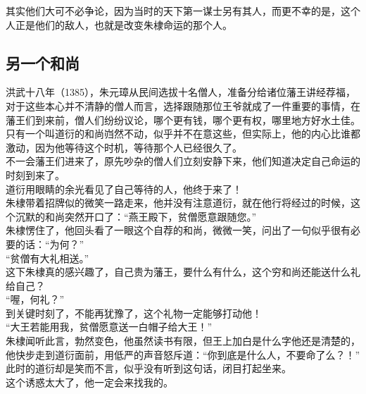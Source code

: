 \begin{multicols}{\theparacolNo}
其实他们大可不必争论，因为当时的天下第一谋士另有其人，而更不幸的是，这个人正是他们的敌人，也就是改变朱棣命运的那个人。\\

\subsection{另一个和尚}
洪武十八年（1385），朱元璋从民间选拔十名僧人，准备分给诸位藩王讲经荐福，对于这些本心并不清静的僧人而言，选择跟随那位王爷就成了一件重要的事情，在藩王们到来前，僧人们纷纷议论，哪个更有钱，哪个更有权，哪里地方好水土佳。\\

只有一个叫道衍的和尚岿然不动，似乎并不在意这些，但实际上，他的内心比谁都激动，因为他等待这个时机，等待那个人已经很久了。\\

不一会藩王们进来了，原先吵杂的僧人们立刻安静下来，他们知道决定自己命运的时刻到来了。\\

道衍用眼睛的余光看见了自己等待的人，他终于来了！\\

朱棣带着招牌似的微笑一路走来，他并没有注意道衍，就在他行将经过的时候，这个沉默的和尚突然开口了：“燕王殿下，贫僧愿意跟随您。”\\

朱棣愣住了，他回头看了一眼这个自荐的和尚，微微一笑，问出了一句似乎很有必要的话：“为何？”\\

“贫僧有大礼相送。”\\

这下朱棣真的感兴趣了，自己贵为藩王，要什么有什么，这个穷和尚还能送什么礼给自己？\\

“喔，何礼？”\\

到关键时刻了，不能再犹豫了，这个礼物一定能够打动他！\\

“大王若能用我，贫僧愿意送一白帽子给大王！”\\

朱棣闻听此言，勃然变色，他虽然读书有限，但王上加白是什么字他还是清楚的，他快步走到道衍面前，用低严的声音怒斥道：“你到底是什么人，不要命了么？！”\\

此时的道衍却是笑而不言，似乎没有听到这句话，闭目打起坐来。\\

这个诱惑太大了，他一定会来找我的。\\


\end{multicols}
